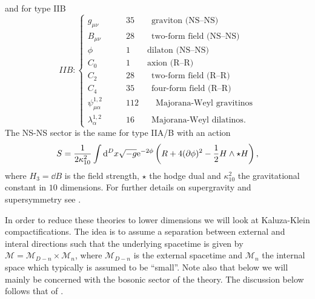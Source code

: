 and for type IIB
\begin{equation*}
    IIB: \begin{cases}
                g_{\mu\nu} \qquad &35 \qquad \text{graviton (NS--NS)}\\
                B_{\mu\nu} \qquad &28 \qquad  \text{two-form field (NS--NS)}\\
                \phi\qquad &1 \qquad  \text{dilaton (NS--NS)}\\
                C_{0}\qquad &1 \qquad  \text{axion (R--R)}\\
                C_{2}\qquad & 28 \qquad  \text{two-form field  (R--R)}\\
                C_{4}\qquad & 35 \qquad  \text{four-form field  (R--R)}\\
                \psi_{\mu\alpha}^{1,2}\qquad &112\qquad \text{Majorana-Weyl gravitinos}\\
                \lambda_\alpha^{1,2} \qquad &16\qquad \text{Majorana-Weyl dilatinos}.
          \end{cases}
\end{equation*}
The NS-NS sector is the same for type IIA/B with an action
\begin{equation*}
    S = \frac{1}{2\kappa_{10}^2}\int \mathrm{d} ^Dx \sqrt{-g}\mathrm{e}^{-2\phi}\left(R+4(\partial\phi)^2-\frac{1}{2}H\wedge\star H\right),
\end{equation*}
where $H_3=\dd B$ is the field strength, $\star$ the hodge dual and $\kappa_{10}^2$ the gravitational constant in $10$ dimensions. For further details on supergravity and supersymmetry see \cite{HokerSugra2002}. 

In order to reduce these theories to lower dimensions we will look at Kaluza-Klein compactifications. The idea is to assume a separation between external and interal directions such that the underlying spacetime is given by $\mathcal{M}=\mathcal{M}_{D-n}\times\mathcal{M}_n$, where $\mathcal{M}_{D-n}$ is the external spacetime and $\mathcal{M}_n$ the internal space which typically is assumed to be ``small''. Note also that below we will mainly be concerned with the bosonic sector of the theory. The discussion below follows that of \cite{PopeKaluzaKlein}.

